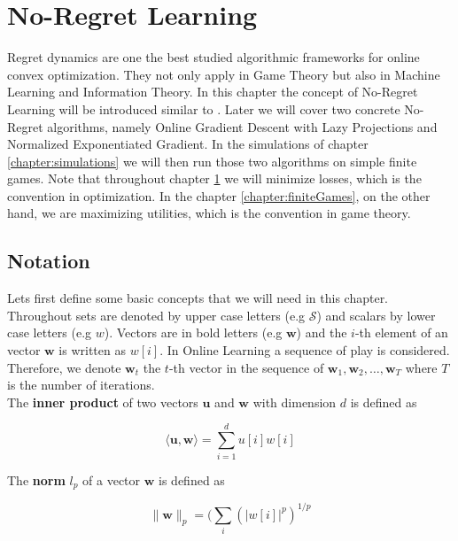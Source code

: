 
\chapter{No-Regret Learning}\label{chapter:noRegretLearning}

Regret dynamics are one the best studied algorithmic frameworks for online convex optimization. They not only apply in Game Theory but also in Machine Learning and Information Theory. In this chapter the concept of No-Regret Learning will be introduced similar to \cite[Chapter 2 Online Convex Optimization]{shalev}. Later we will cover two concrete No-Regret algorithms, namely Online Gradient Descent with Lazy Projections and Normalized Exponentiated Gradient. In the simulations of chapter \ref{chapter:simulations} we will then run those two algorithms on simple finite games. Note that throughout chapter \ref{chapter:noRegretLearning} we will minimize losses, which is the convention in optimization. In the chapter \ref{chapter:finiteGames}, on the other hand, we are maximizing utilities, which is the convention in game theory.

\section{Notation}\label{section:notation}

Lets first define some basic concepts that we will need in this chapter. Throughout sets are denoted by upper case letters (e.g $\mathcal{S}$) and scalars by lower case letters (e.g $w$). Vectors are in bold letters (e.g $\textbf{w}$) and the $i$-th element of an vector $\textbf{w}$ is written as $w[i]$. In Online Learning a sequence of play is considered. Therefore, we denote $\textbf{w}_t$ the $t$-th vector in the sequence of $\textbf{w}_1,\textbf{w}_2,\dots,\textbf{w}_T$ where $T$ is the number of iterations. \\
The \textbf{inner product} of two vectors $\textbf{u}$ and $\textbf{w}$ with dimension $d$ is defined as 

\begin{equation*}
    \langle \textbf{u},\textbf{w}\rangle = \sum_{i=1}^{d}u[i]w[i]
\end{equation*}

The \textbf{norm} $l_p$ of a vector $\textbf{w}$ is defined as

\begin{equation*}
    \|\textbf{w}\|_p = (\sum_{i}(|w[i]|^p)^{1/p}
\end{equation*}

